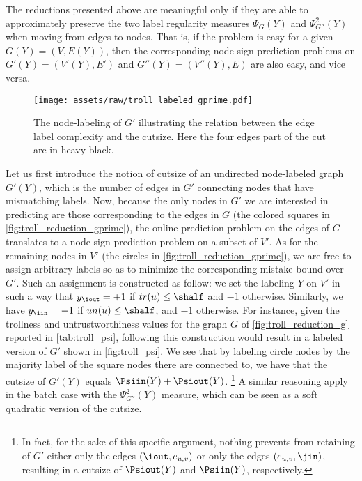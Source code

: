 The reductions presented above are meaningful only if they are able to approximately preserve the
two label regularity measures $\Psi_G(Y)$ and $\Psi^2_{G''}(Y)$ when moving from edges to nodes.
That is, if the \esp{} problem is
easy for a given $G(Y) = (V,E(Y))$, then the corresponding node sign prediction problems on $G'(Y)
= (V'(Y),E')$ and $G''(Y) = (V''(Y),E)$ are also easy, and vice versa.

\begin{wrapfigure}{o}[10mm]{45mm}
	\centering
	\texttt{[image: assets/raw/troll\_labeled\_gprime.pdf]}
	\caption{\small The node-labeling of $G'$ illustrating the relation between the edge label
	  complexity and the cutsize. Here the four edges part of the cut are in heavy black.
	\label{fig:troll_psi}}
\end{wrapfigure}
Let us first introduce the notion of cutsize of an undirected node-labeled graph $G'(Y)$, which is
the number of edges in $G'$ connecting nodes that have mismatching labels.
  Now, because the only nodes in $G'$ we are
  interested in predicting are those corresponding to the edges in $G$ (the colored squares in
  \autoref{fig:troll_reduction_gprime}), the online prediction problem on the edges of $G$ translates to a node
  sign prediction problem on a subset of $V'$. As for the remaining nodes in $V'$ (the circles in
  \autoref{fig:troll_reduction_gprime}), we are free to assign arbitrary labels so as to minimize the corresponding mistake
  bound over $G'$. Such an assignment is constructed as follow: we set the labeling $Y$ on $V'$ in such a
  way that $y_{\iout} = +1$ if $tr(u) \leq \shalf$ and $-1$ otherwise. Similarly, we have $y_{\iin} = +1$ if
  $un(u) \leq \shalf$,
  and $-1$ otherwise. For instance, given the trollness and untrustworthiness values for the graph $G$ of
  \autoref{fig:troll_reduction_g} reported in \autoref{tab:troll_psi}, following this construction
  would result in a labeled version of $G'$ shown in \autoref{fig:troll_psi}.
  We see that by labeling circle nodes by the majority label of the square nodes there are connected
  to, we have that the cutsize of $G'(Y)$ equals  $\Psiin(Y) + \Psiout(Y)$.%
  \footnote{In fact, for the sake of
  this specific argument, nothing prevents from retaining of $G'$ either only the edges
  $(\iout,e_{u,v})$ or only the edges $(e_{u,v},\jin)$, resulting in a cutsize of $\Psiout(Y)$ and
  $\Psiin(Y)$, respectively.}
  A similar reasoning apply in the batch case with the $\Psi^2_{G''}(Y)$ measure, which can be seen
  as a soft quadratic version of the cutsize.


